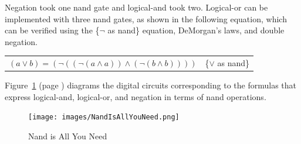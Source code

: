 Negation took one nand gate and
logical-and took two.
Logical-or can be implemented with three nand gates,
as shown in the following equation,
which can be verified using
the \{$\neg$ as nand\} equation, DeMorgan's laws,
and double negation.

\begin{center}
\begin{tabular}{ll}
$(a \vee b) = (\neg ((\neg(a \wedge a)) \wedge (\neg(b \wedge b))))$ & \{$\vee$ as nand\}\label{or-as-nand}
\end{tabular}
\end{center}

Figure~\ref{fig-02-nand-is-all-you-need} (page \pageref{fig-02-nand-is-all-you-need})
diagrams the digital circuits
corresponding to the formulas that express logical-and, logical-or, and negation
in terms of nand operations.

\begin{figure}
\begin{center}
\texttt{[image: images/NandIsAllYouNeed.png]}
\end{center}
\caption{Nand is All You Need}
\label{fig-02-nand-is-all-you-need}
\end{figure}

